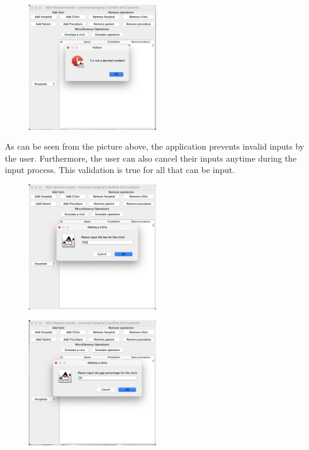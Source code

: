 \documentclass{article}
\begin{document}
\begin{figure}
  \begin{center}
    \includegraphics[width=0.5\textwidth]{./figures/Add/Clinic_3.png}
  \end{center}
\end{figure}

As can be seen from the picture above, the application prevents invalid inputs by the user. Furthermore, the user can also cancel their inputs anytime during the input process. This validation is true for all that can be input.

\begin{figure}
  \begin{center}
    \includegraphics[width=0.5\textwidth]{./figures/Add/Clinic_4.png}
  \end{center}
\end{figure}

\begin{figure}
  \begin{center}
    \includegraphics[width=0.5\textwidth]{./figures/Add/Clinic_5.png}
  \end{center}
\end{figure}
\end{document}
